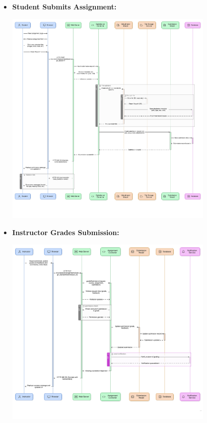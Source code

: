 \documentclass[12pt,a4paper]{article}
\begin{document}
\begin{itemize}
    \item \textbf{Student Submits Assignment:}
    \begin{center}       
        \includegraphics[width=0.8\textwidth,height=0.85\textheight,keepaspectratio]{student-submits-assignment.png}
        \label{fig:student-submits-assignment}
        \end{center}
    \clearpage
    \item \textbf{Instructor Grades Submission:}
    \begin{center}       
        \includegraphics[width=0.8\textwidth,height=0.85\textheight,keepaspectratio]{instructor-grades-submission.png}

\end{center}
\end{itemize}
\end{document}
